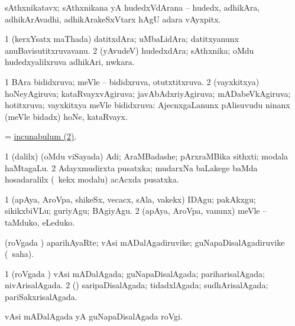 \bentry
{}
\gl{\nA}
\bmng
sAthxnikatavx; sAthxnikana yA hudedxVdArana -- hudedx, adhikAra, adhikArAvadhi, adhikArakeSxVtarx hAgU adara vAyxpitx. 
\emng
\eentry

\bentry
{}
\gl{\nA}
\bmng
\bnum
\num{1} (kerxYsatx maThada) datitxdAra; uMbaLidAra; datitxyanunx anuBavisutitxruvavanu. 
\num{2} (yAvudeV) hudedxdAra; sAthxnika; oMdu hudedxyalilxruva adhikAri, nwkara. 
\enum
\emng
\eentry

\bentry
{}
\gl{\gu}
\bmng
\bnum
\num{1} BAra bididxruva; meVle -- bididxruva, otutxtitxruva. 
\num{2} (vayxkitxya) hoNeyAgiruva; kataRvayxvAgiruva; javAbAdxriyAgiruva; mADabeVkAgiruva; hotitxruva; vayxkitxya meVle bididxruva:  AjecnxgaLanunx pAlisuvudu ninanx (meVle bidadx) hoNe, kataRvayx. 
\enum
\emng
\eentry

\bentry
{}
\gl{\nA}
\bmng
 = \hyperlink{incunabulum(2)}{incunabulum (2)}. 
\emng
\eentry

\bentry
{}
\gl{\nA}
\bmng
\bnum
\num{1} (\bava dalilx) (oMdu viSayada) Adi; AraMBadashe; pArxraMBika sithxti; modala haMtagaLu. 
\hypertarget{incunabulum(2)}{} 
\num{2} Adayxmudirxta pusatxka; mudarxNa baLakege baMda hosadaralilx (\kanmu\ kekx modalu) acAcxda pusatxka. 
\enum
\emng
\eentry

\bentry
{}
\gl{\sakirx}
\bmng
\bnum
\num{1} (apAya, AroVpa, shikeSx, vecacx, sAla, \mo vakekx) IDAgu; pakAkxgu; sikikxbiVLu; guriyAgu; BAgiyAgu. 
\num{2} (apAya, AroVpa, \mo vanunx) meVle -- taMduko, eLeduko. 
\enum
\emng
\eentry

\bentry
{}
\gl{\nA}
\bmng
(roVgada \vi) aparihAyaRte; vAsi mADalAgadiruvike; guNapaDisalAgadiruvike (\rUpa\ saha). 
\emng
\eentry

\bentry
{}
\gl{\gu}
\bmng
\bnum
\num{1} (roVgada \vi) vAsi mADalAgada; guNapaDisalAgada; pariharisalAgada; nivArisalAgada. 
\num{2} (\rUpa) saripaDisalAgada; tidadxlAgada; sudhArisalAgada; pariSakxrisalAgada. 
\enum
\emng
\eentry

\bentry
{}
\gl{\nA}
\bmng
vAsi mADalAgada yA guNapaDisalAgada roVgi. 
\emng
\eentry

